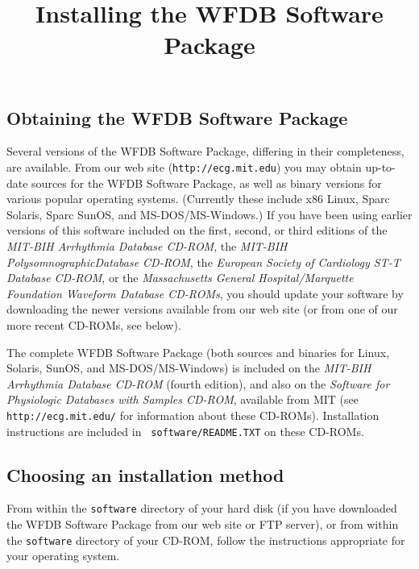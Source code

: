 
\title{Installing the WFDB Software Package}
\author{}
\date{}


\topmargin -0.5625in
\oddsidemargin -0.25in
\evensidemargin -0.25in
\def\columnsep{0.3125 in}
\def\textwidth{6.875 in}
\def\textheight{224 mm}
\flushbottom
\setcounter{page}{98}

\maketitle

\subsection*{Obtaining the WFDB Software Package}

Several versions of the WFDB Software Package, differing in their completeness,
are available.  From our web site ({\tt http://ecg.mit.edu}) you may obtain
up-to-date sources for the WFDB Software Package, as well as binary versions for
various popular operating systems.  (Currently these include x86 Linux, Sparc
Solaris, Sparc SunOS, and MS-DOS/MS-Windows.)  If you have been using earlier
versions of this software included on the first, second, or third editions of
the {\it MIT-BIH Arrhythmia Database CD-ROM}, the {\it MIT-BIH PolysomnographicDatabase CD-ROM}, the {\it European Society of Cardiology ST-T Database
CD-ROM}, or the {\it Massachusetts General Hospital/Marquette Foundation
Waveform Database CD-ROMs}, you should update your software by downloading the
newer versions available from our web site (or from one of our more recent
CD-ROMs, see below).

The complete WFDB Software Package (both sources and binaries for
Linux, Solaris, SunOS, and MS-DOS/MS-Windows) is included on the {\it
MIT-BIH Arrhythmia Database CD-ROM} (fourth edition), and also on the
{\it Software for Physiologic Databases with Samples CD-ROM},
available from MIT (see {\tt http://ecg.mit.edu/} for information
about these CD-ROMs).  Installation instructions are included in {\tt
software/README.TXT} on these CD-ROMs.

\subsection*{Choosing an installation method}

From within the {\tt software} directory of your hard disk (if you have
downloaded the WFDB Software Package from our web site or FTP server), or from
within the {\tt software} directory of your CD-ROM, follow the instructions
appropriate for your operating system.

